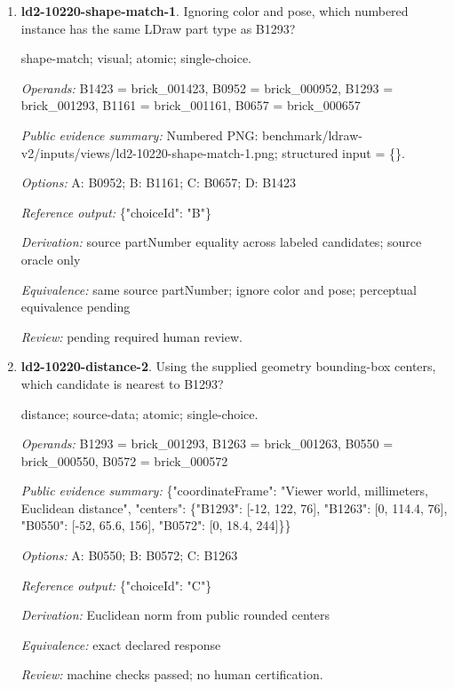 \begin{enumerate}
\par{\small color; visual; atomic; single-choice.\par\textit{Operands:} B1293 = brick\_001293\par\textit{Public evidence summary:} Numbered PNG: benchmark/ldraw-v2/inputs/views/ld2-10220-color-2.png; structured input = \{\}.\par\textit{Options:} A: Bright Light Orange; B: Trans Clear; C: Light Bluish Grey; D: White\par\textit{Reference output:} \{"choiceId": "C"\}\par\textit{Derivation:} source colorName by rendered B-label; source oracle only\par\textit{Equivalence:} exact declared response\par\textit{Review:} pending required human review.}
\item \textbf{ld2-10220-shape-match-1}. Ignoring color and pose, which numbered instance has the same LDraw part type as B1293?
\par{\small shape-match; visual; atomic; single-choice.\par\textit{Operands:} B1423 = brick\_001423, B0952 = brick\_000952, B1293 = brick\_001293, B1161 = brick\_001161, B0657 = brick\_000657\par\textit{Public evidence summary:} Numbered PNG: benchmark/ldraw-v2/inputs/views/ld2-10220-shape-match-1.png; structured input = \{\}.\par\textit{Options:} A: B0952; B: B1161; C: B0657; D: B1423\par\textit{Reference output:} \{"choiceId": "B"\}\par\textit{Derivation:} source partNumber equality across labeled candidates; source oracle only\par\textit{Equivalence:} same source partNumber; ignore color and pose; perceptual equivalence pending\par\textit{Review:} pending required human review.}
\item \textbf{ld2-10220-distance-2}. Using the supplied geometry bounding-box centers, which candidate is nearest to B1293?
\par{\small distance; source-data; atomic; single-choice.\par\textit{Operands:} B1293 = brick\_001293, B1263 = brick\_001263, B0550 = brick\_000550, B0572 = brick\_000572\par\textit{Public evidence summary:} \{"coordinateFrame": "Viewer world, millimeters, Euclidean distance", "centers": \{"B1293": [-12, 122, 76], "B1263": [0, 114.4, 76], "B0550": [-52, 65.6, 156], "B0572": [0, 18.4, 244]\}\}\par\textit{Options:} A: B0550; B: B0572; C: B1263\par\textit{Reference output:} \{"choiceId": "C"\}\par\textit{Derivation:} Euclidean norm from public rounded centers\par\textit{Equivalence:} exact declared response\par\textit{Review:} machine checks passed; no human certification.}

\end{enumerate}
